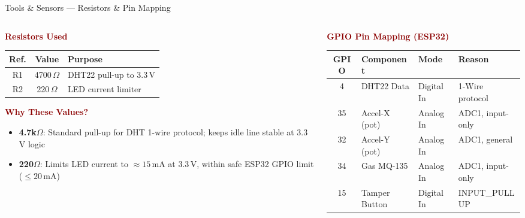 \documentclass[aspectratio=169, 10pt]{beamer}
\begin{document}
\begin{frame}[shrink=3]{Tools \& Sensors --- Resistors \& Pin Mapping}
  \begin{columns}[T]
    \begin{column}{0.46\textwidth}
      \textbf{\textcolor{darkred}{Resistors Used}}
      \vspace{0.2em}
      {\small
      \begin{tabular}{@{}ccl@{}}
        \toprule
        \textbf{Ref.} & \textbf{Value} & \textbf{Purpose} \\
        \midrule
        R1 & 4700\,$\Omega$ & DHT22 pull-up to 3.3\,V \\
        R2 & 220\,$\Omega$ & LED current limiter \\
        \bottomrule
      \end{tabular}
      }
      \vspace{0.4em}
      \textbf{\textcolor{darkred}{Why These Values?}}
      \begin{itemize}\setlength\itemsep{0.25em}
        \item \textbf{4.7k$\Omega$}: Standard pull-up for DHT 1-wire protocol; keeps idle line stable at 3.3\,V logic
        \item \textbf{220$\Omega$}: Limits LED current to $\approx15$\,mA at 3.3\,V, within safe ESP32 GPIO limit ($\leq20$\,mA)
      \end{itemize}
    \end{column}
    \begin{column}{0.54\textwidth}
      \textbf{\textcolor{darkred}{GPIO Pin Mapping (ESP32)}}
      \vspace{0.2em}
      {\small
      \begin{tabular}{@{}clll@{}}
        \toprule
        \textbf{GPIO} & \textbf{Component} & \textbf{Mode} & \textbf{Reason} \\
        \midrule
        4  & DHT22 Data     & Digital In  & 1-Wire protocol \\
        35 & Accel-X (pot)  & Analog In   & ADC1, input-only \\
        32 & Accel-Y (pot)  & Analog In   & ADC1, general \\
        34 & Gas MQ-135     & Analog In   & ADC1, input-only \\
        15 & Tamper Button  & Digital In  & INPUT\_PULLUP \\

\end{tabular}}
\end{column}
\end{columns}
\end{frame}
\end{document}
